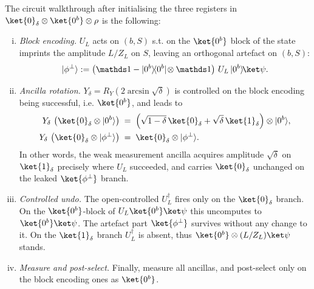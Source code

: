 The circuit walkthrough after initialising the three registers in $\ket{0}_\delta \otimes \ket{0^b} \otimes \rho$ is the following:
\begin{enumerate}[(i)]
    \item \emph{Block encoding.} $U_L$ acts on $(b, S)$ s.t. on the $\ket{0^b}$ block of the state imprints the amplitude $L/Z_L$ on $S$, leaving an orthogonal artefact on $(b, S)$:
    $$
    |\phi^\perp\rangle := \left(\idm - |0^b\rangle\!\langle0^b|\!\otimes\idm\right)\,U_L\,|0^b\rangle\!\ket\psi.
    $$
    \item \emph{Ancilla rotation.} $Y_\delta = R_Y(2\arcsin\sqrt\delta)$ is controlled on the block encoding being successful, i.e. $\ket{0^b}$, and leads to
    \begin{equation}
        \begin{split}
            Y_\delta\,\left(\ket{0}_\delta\otimes|0^b\rangle\right) &\;=\; \left(\sqrt{1-\delta}\,\ket{0}_\delta + \sqrt{\delta}\,\ket{1}_\delta\right)\otimes |0^b\rangle, \\
            Y_\delta\,\left(\ket{0}_\delta\otimes |\phi^\perp\rangle\right) &\;=\; \ket{0}_\delta\otimes|\phi^\perp\rangle.
        \end{split}
    \end{equation}
    In other words, the weak measurement ancilla acquires amplitude $\sqrt{\delta}$ on $\ket{1}_\delta$ precisely where $U_L$ succeeded, and carries $\ket{0}_\delta$ unchanged on the leaked $\ket{\phi^\perp}$ branch.
    \item \emph{Controlled undo.} The open-controlled $U_L^\dagger$ fires only on the $\ket{0}_\delta$ branch. On the $\ket{0^b}$-block of $U_L\ket{0^b}\ket\psi$ this uncomputes to $\ket{0^b}\ket\psi$. The artefact part $\ket{\phi^\perp}$ survives without any change to it. On the $\ket{1}_\delta$ branch $U_L^\dagger$ is absent, thus $\ket{0^b}\otimes(L/Z_L)\ket\psi$ stands.
    \item \emph{Measure and post-select.} Finally, measure all ancillas, and post-select only on the block encoding ones as $\ket{0^b}$.
\end{enumerate}

